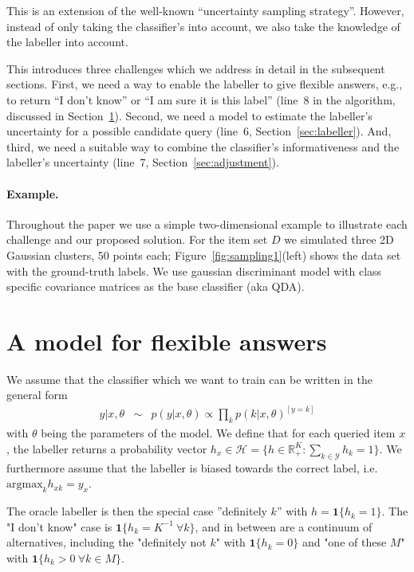 \documentclass[10pt, onecolumn]{article}
\newcommand{\answer}{h}
\renewcommand{\H}{\mathcal{H}}
\newcommand{\R}{\mathbb{R}}
\newcommand{\C}{\mathcal{Y}}
\begin{document}
This is an extension of the well-known ``uncertainty sampling
strategy''. However, instead of only taking the classifier's into
account, we also take the knowledge of the labeller into account.

This introduces three challenges which we address in detail in the
subsequent sections. First, we need a way to enable the labeller to
give flexible answers, e.g., to return ``I don't know'' or ``I am sure
it is this label'' (line~8 in the algorithm, discussed in
Section~\ref{sec:answers}). Second, we need a model to estimate the
labeller's uncertainty for a possible candidate query (line~6,
Section~\ref{sec:labeller}). And, third, we need a suitable way to
combine the classifier's informativeness and the labeller's
uncertainty (line~7, Section~\ref{sec:adjustment}).


\paragraph{Example.} Throughout the paper we use a simple
two-dimensional example to illustrate each challenge and our proposed
solution. For the item set $D$ we simulated three 2D Gaussian
clusters, 50 points each; Figure~\ref{fig:sampling1}(left) shows the
data set with the ground-truth labels. We use gaussian discriminant model with class specific covariance matrices as the base classifier (aka QDA).


\section{A model for flexible answers}
\label{sec:answers}

We assume that the classifier which we want to train can be written in the general form
\begin{eqnarray}
y | x, \theta &\sim & p(y| x, \theta)\propto\prod_k p(k|x,\theta)^{[y=k]}%
\end{eqnarray}
with $\theta$ being the parameters of the model. %
We define that for each queried item $x$, the labeller returns a probability vector $\answer_x \in \H=\{h\in \R_+^K: \sum_{k\in \C} h_k=1\}$. We furthermore assume that the labeller is biased towards the correct label, i.e. $\mathrm{argmax}_k h_{xk}=y_x$.

The oracle labeller is then the special case ''definitely $k$'' with
$h=\mathbf{1}\{h_k=1\}$. The "I don't know" case is $\mathbf{1}\{
h_k=K^{-1}\ \forall k\}$, and in between are a continuum of
alternatives, including the "definitely not $k$" with
$\mathbf{1}\{h_k=0\}$ and "one of these $M$" with $\mathbf{1}\{h_k>0\
\forall k\in M\}$. 
\end{document}
